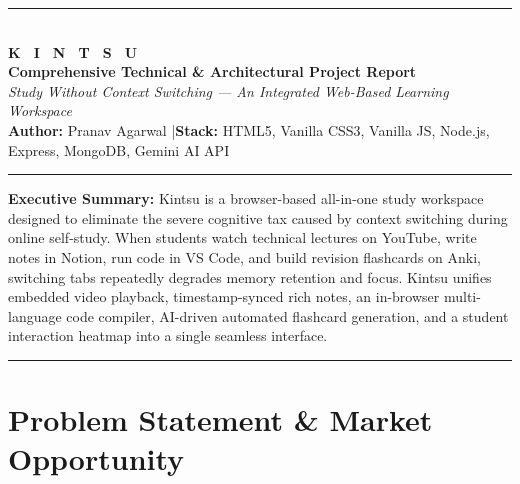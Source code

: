 \documentclass[12pt,a4paper]{article}
\begin{document}
\begin{center}
  {\color{kintsuPink}\rule{\textwidth}{2pt}}\\[0.3cm]
  {\Huge\bfseries\color{kintsuDark} K \, I \, N \, T \, S \, U}\\[0.2cm]
  {\large\bfseries\color{kintsuPink} Comprehensive Technical \& Architectural Project Report}\\[0.1cm]
  {\small\color{kintsuGray}\textit{Study Without Context Switching --- An Integrated Web-Based Learning Workspace}}\\[0.2cm]
  {\small \textbf{Author:} Pranav Agarwal \quad|\quad \textbf{Stack:} HTML5, Vanilla CSS3, Vanilla JS, Node.js, Express, MongoDB, Gemini AI API}\\[0.2cm]
  {\color{kintsuPink}\rule{\textwidth}{2pt}}
\end{center}

\vspace{0.2cm}

\begin{insightbox}
\textbf{Executive Summary:} Kintsu is a browser-based all-in-one study workspace designed to eliminate the severe cognitive tax caused by context switching during online self-study. When students watch technical lectures on YouTube, write notes in Notion, run code in VS Code, and build revision flashcards on Anki, switching tabs repeatedly degrades memory retention and focus. Kintsu unifies embedded video playback, timestamp-synced rich notes, an in-browser multi-language code compiler, AI-driven automated flashcard generation, and a student interaction heatmap into a single seamless interface.
\end{insightbox}

\tableofcontents
\vspace{0.4cm}
\hrule
\vspace{0.4cm}

\section{Problem Statement \& Market Opportunity}
\end{document}

